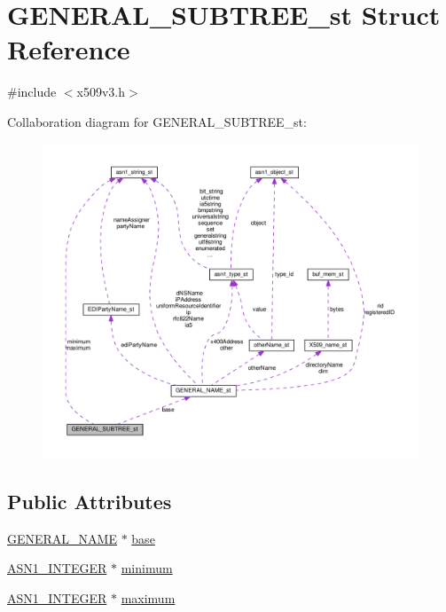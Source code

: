 \hypertarget{struct_g_e_n_e_r_a_l___s_u_b_t_r_e_e__st}{}\section{G\+E\+N\+E\+R\+A\+L\+\_\+\+S\+U\+B\+T\+R\+E\+E\+\_\+st Struct Reference}
\label{struct_g_e_n_e_r_a_l___s_u_b_t_r_e_e__st}


{\ttfamily \#include $<$x509v3.\+h$>$}



Collaboration diagram for G\+E\+N\+E\+R\+A\+L\+\_\+\+S\+U\+B\+T\+R\+E\+E\+\_\+st\+:
\nopagebreak
\begin{figure}[H]
\begin{center}
\leavevmode
\includegraphics[width=350pt]{struct_g_e_n_e_r_a_l___s_u_b_t_r_e_e__st__coll__graph}
\end{center}
\end{figure}
\subsection*{Public Attributes}
\begin{DoxyCompactItemize}
\item 
\hyperlink{x509v3_8h_a6688fb8a0c7b8e63f3d47bac3a09eb15}{G\+E\+N\+E\+R\+A\+L\+\_\+\+N\+A\+ME} $\ast$ \hyperlink{struct_g_e_n_e_r_a_l___s_u_b_t_r_e_e__st_a377ac586fdda36e7ec625fd30dce46f2}{base}
\item 
\hyperlink{ossl__typ_8h_af4335399bf9774cb410a5e93de65998b}{A\+S\+N1\+\_\+\+I\+N\+T\+E\+G\+ER} $\ast$ \hyperlink{struct_g_e_n_e_r_a_l___s_u_b_t_r_e_e__st_a57dba1d7a481583e1564730497dcb672}{minimum}
\item 
\hyperlink{ossl__typ_8h_af4335399bf9774cb410a5e93de65998b}{A\+S\+N1\+\_\+\+I\+N\+T\+E\+G\+ER} $\ast$ \hyperlink{struct_g_e_n_e_r_a_l___s_u_b_t_r_e_e__st_a19f63f3012ce4f64c219de133c9ff488}{maximum}
\end{DoxyCompactItemize}


